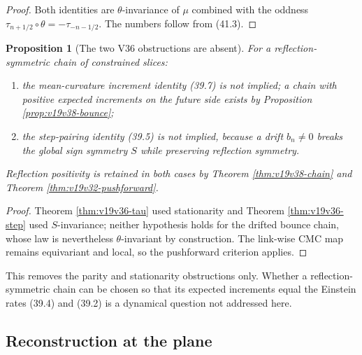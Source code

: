 \documentclass[11pt]{article}
\newtheorem{proposition}[theorem]{Proposition}
\theoremstyle{remark}
\begin{document}
\begin{proof}
Both identities are \(\theta\)-invariance of \(\mu\) combined with the
oddness \(\tau_{n+1/2}\circ\theta=-\tau_{-n-1/2}\).  The numbers follow
from (41.3).
\end{proof}

\begin{proposition}[The two V36 obstructions are absent]
\label{prop:v19v38-lifted}
For a reflection-symmetric chain of constrained slices:
\begin{enumerate}
\item the mean-curvature increment identity (39.7) is not implied; a
      chain with positive expected increments on the future side
      exists by Proposition \ref{prop:v19v38-bounce};
\item the step-pairing identity (39.5) is not implied, because a drift
      \(b_n\neq0\) breaks the global sign symmetry \(S\) while preserving
      reflection symmetry.
\end{enumerate}
Reflection positivity is retained in both cases by Theorem
\ref{thm:v19v38-chain} and Theorem \ref{thm:v19v32-pushforward}.
\end{proposition}

\begin{proof}
Theorem \ref{thm:v19v36-tau} used stationarity and Theorem
\ref{thm:v19v36-step} used \(S\)-invariance; neither hypothesis holds
for the drifted bounce chain, whose law is nevertheless
\(\theta\)-invariant by construction.  The link-wise CMC map remains
equivariant and local, so the pushforward criterion applies.
\end{proof}

This removes the parity and stationarity obstructions only.  Whether a
reflection-symmetric chain can be chosen so that its expected increments
equal the Einstein rates (39.4) and (39.2) is a dynamical question not
addressed here.

\subsection{Reconstruction at the plane}
\end{document}
